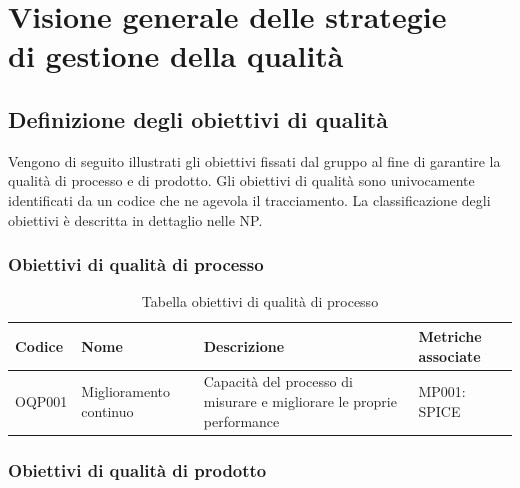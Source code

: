 \documentclass[openany,12pt,a4paper]{report}
\begin{document}

\chapter{Visione generale delle strategie \\ di gestione della qualità}
    
    
    \section{Definizione degli obiettivi di qualità}    
    
    Vengono di seguito illustrati gli obiettivi fissati dal gruppo al fine di garantire la qualità di processo e di prodotto. Gli obiettivi di qualità sono univocamente identificati da un codice che ne agevola il tracciamento. La classificazione degli obiettivi è descritta in dettaglio nelle NP.
    
    \subsection{Obiettivi di qualità di processo}
    
    	\begin{longtable}{| p{2cm} | p{3.5cm} |p{5.5cm} | p{5.5cm} |}
    		\caption {Tabella obiettivi di qualità di processo} \label{tab:Tabella obiettivi di qualita di processo} \\
    		\hline
    		\textbf{Codice} & \textbf{Nome} & \textbf{Descrizione} & \textbf{Metriche associate}\\
    		\hline
    		\endhead
    		
    		\newline OQP001&
    		\newline Miglioramento continuo&
    		\newline Capacità del processo di misurare e migliorare le proprie performance \newline &
    		\newline MP001: SPICE
    		\\[1em]
    		
    		\hline
    	\end{longtable}
    \hfill \break
    \hfill \break
    \hfill \break
    \hfill \break
    \hfill \break
    \hfill \break
    \hfill \break
    
    \subsection{Obiettivi di qualità di prodotto}
        
\end{document}
